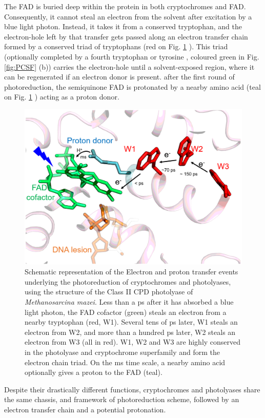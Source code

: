 The FAD is buried deep within the protein in both cryptochromes and FAD. Consequently, it cannot steal an electron from the solvent after excitation by a blue light photon. Instead, it takes it from a conserved tryptophan, and the electron-hole left by that transfer gets passed along an electron transfer chain formed by a conserved triad of tryptophans (red on Fig. \ref{fig:transferchain} \cite{liuDeterminingCompleteElectron2013, lacombatUltrafastOxidationTyrosine2019}). This triad (optionally completed by a fourth tryptophan \parencite{celliniStructuralBasisRadical2022} or tyrosine \parencite{franz-badurStructuralChangesBifunctional2019}, coloured green in Fig. \ref{fig:PCSF} (b)) carries the electron-hole until a solvent-exposed region, where it can be regenerated if an electron donor is present. after the first round of photoreduction, the semiquinone FAD is protonated by a nearby amino acid (teal on Fig. \ref{fig:transferchain} ) acting as a proton donor. 
\begin{figure}[H]
  \centering
  \includegraphics[width=\textwidth]{images/cracry/transfer_chain.pdf}
  \hfill
  \caption{Schematic representation of the Electron and proton transfer events underlying the photoreduction of cryptochromes and photolyases, using the structure of the Class II CPD photolyase of \textit{Methanosarcina mazei}. Less than a ps after it has absorbed a blue light photon, the FAD cofactor (green) steals an electron from a nearby tryptophan (red, W1). Several tens of ps later, W1 steals an electron from W2, and more than a hundred ps later, W2 steals an electron from W3 (all in red). W1, W2 and W3 are highly conserved in the photolyase and cryptochrome superfamily and form the electron chain triad. On the ms time scale, a nearby amino acid optionally gives a proton to the FAD (teal). }\label{fig:transferchain}
\end{figure}
Despite their drastically different functions, cryptochromes and photolyases share the same chassis, and framework of photoreduction scheme, followed by an electron transfer chain and a potential protonation. 

